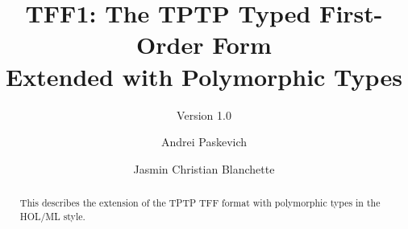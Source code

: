 \documentclass[draft,a4paper]{llncs}
\begin{document}
\title{
TFF1: The TPTP Typed First-Order Form \\ Extended with Polymorphic Types}
\subtitle{Version 1.0}

\author{
Andrei Paskevich \and Jasmin Christian Blanchette
}


\maketitle

\begin{abstract}
This \paper{} describes the extension of the TPTP TFF format with polymorphic
types in the HOL/ML style.
\end{abstract}











\end{document}
